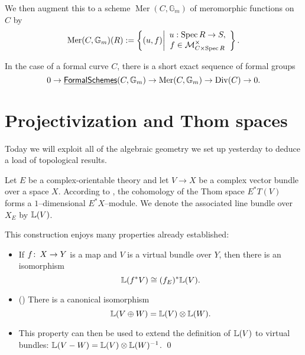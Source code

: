 \begin{definition}
We then augment this to a scheme $\operatorname{Mer}(C, \mathbb G_m)$ of meromorphic functions on $C$ by \[\operatorname{Mer}(C, \mathbb G_m)(R) := \left\{ (u, f) \middle| \begin{array}{c} u: \operatorname{Spec} R \to S, \\ f \in \mathcal{M}^\times_{C \times \operatorname{Spec} R} \end{array} \right\}.\]
\end{definition}

\begin{theorem}
In the case of a formal curve $C$, there is a short exact sequence of formal groups \[0 \to \operatorname{\underline{\smash{\mathsf{FormalSchemes}}}}(C, \mathbb G_m) \to \operatorname{Mer}(C, \mathbb G_m) \to \operatorname{Div}(C) \to 0.\]
\end{theorem}







\section{Projectivization and Thom spaces}

Today we will exploit all of the algebraic geometry we set up yesterday to deduce a load of topological results.  

\begin{definition}
Let $E$ be a complex-orientable theory and let $V \to X$ be a complex vector bundle over a space $X$.  According to , the cohomology of the Thom space $E^* T(V)$ forms a $1$--dimensional $E^* X$--module.  We denote the associated line bundle over $X_E$ by $\mathbb{L}(V)$.
\end{definition}

\begin{corollary}
This construction enjoys many properties already established:
\begin{itemize}
\item If $f \colon\thinspace X \to Y$ is a map and $V$ is a virtual bundle over $Y$, then there is an isomorphism \[\mathbb{L}(f^* V) \cong (f_E)^* \mathbb{L}(V).\]
\item () There is a canonical isomorphism \[\mathbb{L}(V \oplus W) = \mathbb{L}(V) \otimes \mathbb{L}(W).\]
\item This property can then be used to extend the definition of $\mathbb{L}(V)$ to virtual bundles: $\mathbb{L}(V - W) = \mathbb{L}(V) \otimes \mathbb{L}(W)^{-1}$.
\qed
\end{itemize}
\end{corollary}

